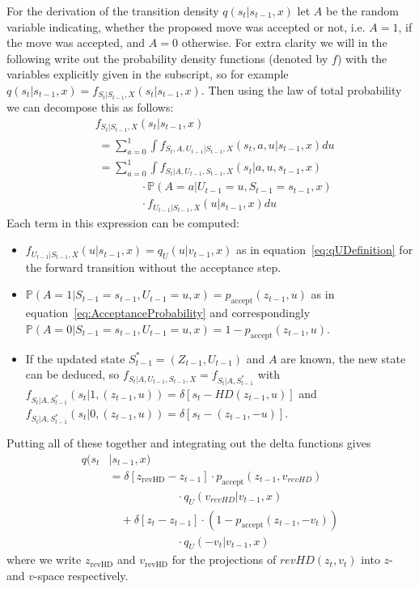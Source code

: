 For the derivation of the transition density $q(s_t|s_{t-1}, x)$ let $A$ be the random variable indicating, whether the proposed move was accepted or not, i.e. $A=1$, if the move was accepted, and $A=0$ otherwise. For extra clarity we will in the following write out the probability density functions (denoted by $f$) with the variables explicitly given in the subscript, so for example $q(s_t|s_{t-1}, x) = f_{S_t|S_{t-1}, X}(s_t|s_{t-1}, x)$. Then using the law of total probability we can decompose this as follows:
\begin{equation}
\begin{split}
&f_{S_t|S_{t-1}, X}(s_t|s_{t-1}, x)\\
&\;=\sum_{a=0}^1 \int f_{S_t, A, U_{t-1}|S_{t-1}, X}(s_t, a, u|s_{t-1}, x) du \\
&\;=\sum_{a=0}^1 \int f_{S_t|A, U_{t-1}, S_{t-1}, X}(s_t| a, u, s_{t-1}, x) \\
&\qquad\qquad\cdot \mathbb{P}(A = a|U_{t-1} = u, S_{t-1} = s_{t-1}, x) \\
&\qquad\qquad \cdot f_{U_{t-1}|S_{t-1}, X}(u|s_{t-1}, x) du
\end{split}
\end{equation}
Each term in this expression can be computed:
\begin{itemize}
\item $f_{U_{t-1}|S_{t-1}, X}(u|s_{t-1}, x) = q_U(u|v_{t-1}, x)$ as in equation~\eqref{eq:qUDefinition} for the forward transition without the acceptance step.
\item $\mathbb{P}(A=1|S_{t-1} = s_{t-1}, U_{t-1} = u, x) = p_{\textrm{accept}}(z_{t-1}, u)$ as in equation~\eqref{eq:AcceptanceProbability} and correspondingly $\mathbb{P}(A=0|S_{t-1} = s_{t-1}, U_{t-1} = u, x) = 1- p_{\textrm{accept}}(z_{t-1}, u)$.
\item If the updated state $S^*_{t-1} = (Z_{t-1}, U_{t-1})$ and $A$ are known, the new state can be deduced, so $f_{S_t|A, U_{t-1}, S_{t-1}, X} = f_{S_t|A, S^*_{t-1}}$ with $f_{S_t|A, S^*_{t-1}}(s_t| 1, (z_{t-1}, u)) = \delta \left[s_t - HD(z_{t-1}, u) \right]$ and $f_{S_t|A, S^*_{t-1}}(s_t| 0, (z_{t-1}, u)) = \delta \left[s_t - (z_{t-1}, -u) \right]$.
\end{itemize}

Putting all of these together and integrating out the delta functions gives
\begin{equation}
\begin{split}
q(s_t& |s_{t-1}, x) \\
&= \delta \left[z_{\textrm{revHD}} - z_{t-1} \right] \cdot p_{\textrm{accept}}(z_{t-1}, v_{revHD}) \\
&\qquad\qquad\qquad \cdot q_U(v_{revHD}|v_{t-1}, x) \\
&\quad + \delta \left[ z_t - z_{t-1} \right] \cdot (1 - p_{\textrm{accept}}(z_{t-1}, -v_t)) \\
&\qquad\qquad\qquad \cdot q_U(-v_t|v_{t-1}, x)
\end{split}
\end{equation}
where we write $z_{\textrm{revHD}}$ and $v_{\textrm{revHD}}$ for the projections of $revHD(z_t, v_t)$ into $z$- and $v$-space respectively.

